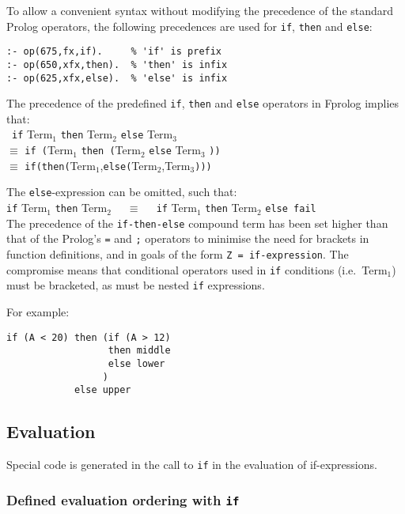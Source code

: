 \documentclass[a4paper,11pt,twoside]{article}
\begin{document}
To allow a convenient syntax without modifying the precedence of the standard
Prolog operators, the following precedences are used for \texttt{if},
\texttt{then} and \texttt{else}:
\begin{verbatim}
:- op(675,fx,if).     % 'if' is prefix
:- op(650,xfx,then).  % 'then' is infix
:- op(625,xfx,else).  % 'else' is infix
\end{verbatim}
The precedence of the predefined \texttt{if}, \texttt{then} and \texttt{else}
operators in Fprolog implies that:\\\
\texttt{if} Term$_1$ \texttt{then} Term$_2$ \texttt{else} Term$_3$\\
$\equiv$ \texttt{if (}Term$_1$ \texttt{then (}Term$_2$ \texttt{else} Term$_3$ \texttt{))}\\
$\equiv$ \texttt{if(}\texttt{then(}Term$_1$,\texttt{else(}Term$_2$,Term$_3$\texttt{)))}

The \texttt{else}-expression can be omitted, such that:\\
\texttt{if} Term$_1$ \texttt{then} Term$_2$ \texttt{~~}$\equiv$
\texttt{~~if} Term$_1$ \texttt{then} Term$_2$ \texttt{else fail}\\

The precedence of the \texttt{if-then-else} compound term has been set
higher than that of the Prolog's \texttt{=} and \texttt{;} operators
to minimise the need
for brackets in function definitions, and in goals of the form
\texttt{Z = if-expression}.  The compromise means that conditional
operators used in \texttt{if} conditions (i.e.\ Term$_1$) must
be bracketed, as must be nested \texttt{if} expressions.

For example:
\begin{verbatim}
if (A < 20) then (if (A > 12)
                  then middle
                  else lower
                 )
            else upper
\end{verbatim}

\subsection{Evaluation}

Special code is generated in the call to \texttt{if} in the evaluation of
if-expressions.

\subsubsection{Defined evaluation ordering with \texttt{if}}
\end{document}
